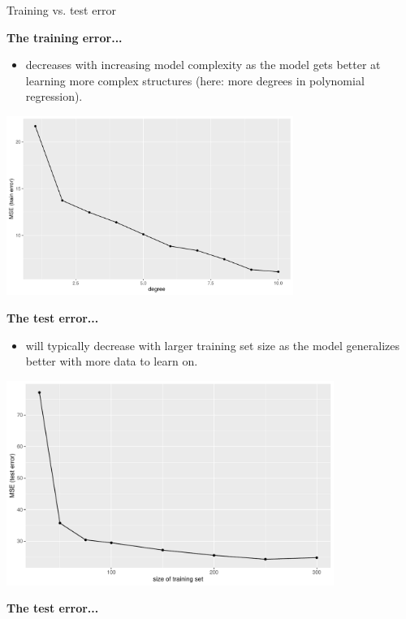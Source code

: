 \documentclass[11pt,compress,t,notes=noshow, xcolor=table]{beamer}
\begin{document}
\begin{vbframe}{Training vs. test error}
\framebreak

\textbf{The training error...}
\begin{itemize}  
  \item decreases with increasing model complexity as the model gets better at
  learning more complex structures (here: more degrees in polynomial regression).
\end{itemize}

\begin{center}
\includegraphics[width=0.7\textwidth]{figure/fig-train-vs-test-error-4}
\end{center}

\framebreak

\textbf{The test error...}

\begin{itemize}
  \item will typically decrease with larger training set size as the model 
  generalizes better with more data to learn on.
  
\end{itemize}
\begin{center}
\includegraphics[width=0.8\textwidth]{figure/fig-train-vs-test-error-2}
\end{center} 

\framebreak
\textbf{The test error...}


\end{vbframe}
\end{document}
